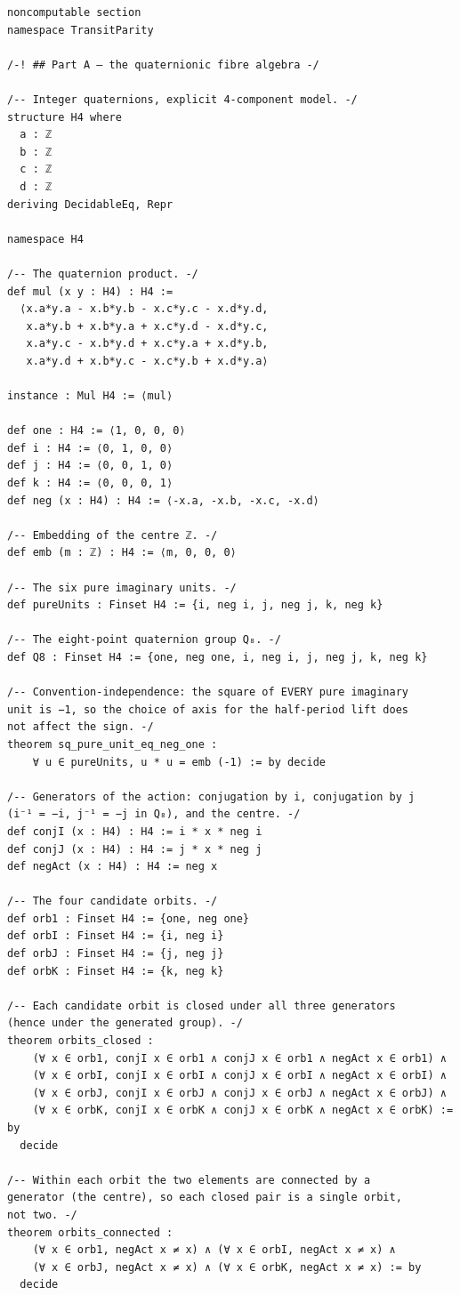 \documentclass[11pt,a4paper]{article}
\theoremstyle{plain}
\theoremstyle{definition}
\theoremstyle{remark}
\begin{document}
\begin{Verbatim}[fontsize=\footnotesize,breaklines=true,breakanywhere=true,formatcom=\leanmono]
noncomputable section
namespace TransitParity

/-! ## Part A — the quaternionic fibre algebra -/

/-- Integer quaternions, explicit 4-component model. -/
structure H4 where
  a : ℤ
  b : ℤ
  c : ℤ
  d : ℤ
deriving DecidableEq, Repr

namespace H4

/-- The quaternion product. -/
def mul (x y : H4) : H4 :=
  ⟨x.a*y.a - x.b*y.b - x.c*y.c - x.d*y.d,
   x.a*y.b + x.b*y.a + x.c*y.d - x.d*y.c,
   x.a*y.c - x.b*y.d + x.c*y.a + x.d*y.b,
   x.a*y.d + x.b*y.c - x.c*y.b + x.d*y.a⟩

instance : Mul H4 := ⟨mul⟩

def one : H4 := ⟨1, 0, 0, 0⟩
def i : H4 := ⟨0, 1, 0, 0⟩
def j : H4 := ⟨0, 0, 1, 0⟩
def k : H4 := ⟨0, 0, 0, 1⟩
def neg (x : H4) : H4 := ⟨-x.a, -x.b, -x.c, -x.d⟩

/-- Embedding of the centre ℤ. -/
def emb (m : ℤ) : H4 := ⟨m, 0, 0, 0⟩

/-- The six pure imaginary units. -/
def pureUnits : Finset H4 := {i, neg i, j, neg j, k, neg k}

/-- The eight-point quaternion group Q₈. -/
def Q8 : Finset H4 := {one, neg one, i, neg i, j, neg j, k, neg k}

/-- Convention-independence: the square of EVERY pure imaginary
unit is −1, so the choice of axis for the half-period lift does
not affect the sign. -/
theorem sq_pure_unit_eq_neg_one :
    ∀ u ∈ pureUnits, u * u = emb (-1) := by decide

/-- Generators of the action: conjugation by i, conjugation by j
(i⁻¹ = −i, j⁻¹ = −j in Q₈), and the centre. -/
def conjI (x : H4) : H4 := i * x * neg i
def conjJ (x : H4) : H4 := j * x * neg j
def negAct (x : H4) : H4 := neg x

/-- The four candidate orbits. -/
def orb1 : Finset H4 := {one, neg one}
def orbI : Finset H4 := {i, neg i}
def orbJ : Finset H4 := {j, neg j}
def orbK : Finset H4 := {k, neg k}

/-- Each candidate orbit is closed under all three generators
(hence under the generated group). -/
theorem orbits_closed :
    (∀ x ∈ orb1, conjI x ∈ orb1 ∧ conjJ x ∈ orb1 ∧ negAct x ∈ orb1) ∧
    (∀ x ∈ orbI, conjI x ∈ orbI ∧ conjJ x ∈ orbI ∧ negAct x ∈ orbI) ∧
    (∀ x ∈ orbJ, conjI x ∈ orbJ ∧ conjJ x ∈ orbJ ∧ negAct x ∈ orbJ) ∧
    (∀ x ∈ orbK, conjI x ∈ orbK ∧ conjJ x ∈ orbK ∧ negAct x ∈ orbK) := by
  decide

/-- Within each orbit the two elements are connected by a
generator (the centre), so each closed pair is a single orbit,
not two. -/
theorem orbits_connected :
    (∀ x ∈ orb1, negAct x ≠ x) ∧ (∀ x ∈ orbI, negAct x ≠ x) ∧
    (∀ x ∈ orbJ, negAct x ≠ x) ∧ (∀ x ∈ orbK, negAct x ≠ x) := by
  decide


\end{Verbatim}
\end{document}
